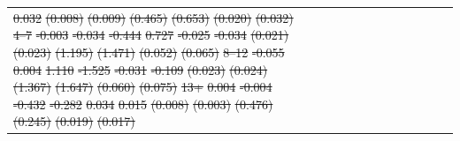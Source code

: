 \documentclass[12pt,english]{article}
\providecommand{\DIFdeltex}[1]{{\protect\color{red}\sout{#1}}}                      %
\providecommand{\DIFdelFL}[1]{\DIFdel{#1}} %
\providecommand{\DIFdel}[1]{\texorpdfstring{\DIFdeltex{#1}}{}} %
\begin{document}
\begin{table}[!ht]
\begin{center}
\begin{adjustbox}{max width=.9\linewidth}
\begin{threeparttable}
{\begin{tabular}{l*{6}{S S}}
\DIFdelFL{0.032         }%
\DIFdelFL{(0.008)         }%
\DIFdelFL{(0.009)         }%
\DIFdelFL{(0.465)         }%
\DIFdelFL{(0.653)         }%
\DIFdelFL{(0.020)         }%
\DIFdelFL{(0.032)         }%
\DIFdelFL{4--7 }%
\DIFdelFL{-0.003         }%
\DIFdelFL{-0.034         }%
\DIFdelFL{-0.444         }%
\DIFdelFL{0.727         }%
\DIFdelFL{-0.025         }%
\DIFdelFL{-0.034         }%
\DIFdelFL{(0.021)         }%
\DIFdelFL{(0.023)         }%
\DIFdelFL{(1.195)         }%
\DIFdelFL{(1.471)         }%
\DIFdelFL{(0.052)         }%
\DIFdelFL{(0.065)         }%
\DIFdelFL{8--12 }%
\DIFdelFL{-0.055}%
\DIFdelFL{0.004         }%
\DIFdelFL{1.110         }%
\DIFdelFL{-1.525         }%
\DIFdelFL{-0.031         }%
\DIFdelFL{-0.109         }%
\DIFdelFL{(0.023)         }%
\DIFdelFL{(0.024)         }%
\DIFdelFL{(1.367)         }%
\DIFdelFL{(1.647)         }%
\DIFdelFL{(0.060)         }%
\DIFdelFL{(0.075)         }%
\DIFdelFL{13+ }%
\DIFdelFL{0.004         }%
\DIFdelFL{-0.004         }%
\DIFdelFL{-0.432         }%
\DIFdelFL{-0.282         }%
\DIFdelFL{0.034}%
\DIFdelFL{0.015         }%
\DIFdelFL{(0.008)         }%
\DIFdelFL{(0.003)         }%
\DIFdelFL{(0.476)         }%
\DIFdelFL{(0.245)         }%
\DIFdelFL{(0.019)         }%
\DIFdelFL{(0.017)         }%

\end{tabular}}
\end{threeparttable}
\end{adjustbox}
\end{center}
\end{table}
\end{document}
